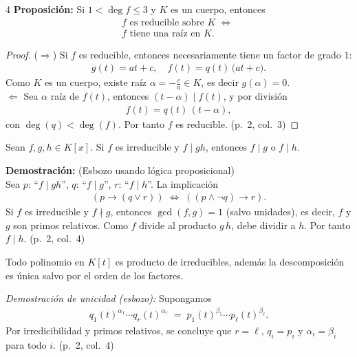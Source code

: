 \documentclass[landscape,a4paper]{article}
\begin{document}
\begin{multicols}{4}
\noindent \textbf{Proposición:} Si $1 < \deg f \le 3$ y $K$ es un cuerpo, entonces 
\begin{align*}
f \text{ es reducible sobre }K \;\Longleftrightarrow\; \\f \text{ tiene una raíz en }K.
\end{align*}
\begin{proof}
($\Rightarrow$) Si $f$ es reducible, entonces necesariamente tiene un factor de grado $1$: 
\begin{align*}
g(t) = a t + c, 
\quad
f(t) = q(t)\,\bigl(a t + c\bigr).
\end{align*}
Como $K$ es un cuerpo, existe raíz $\alpha = -\frac{c}{a} \in K$, es decir $g(\alpha)=0$.\\
$\Longleftarrow$ Sea $\alpha$ raíz de $f(t)$, entonces $(t - \alpha)\mid f(t)$, y por división 
\begin{align*}
f(t) = q(t)\,(t - \alpha),
\end{align*}
con $\deg(q)<\deg(f)$. Por tanto $f$ es reducible. (p.~2, col.~3)
\end{proof}
\begin{tcolorbox}[colback=white,colframe=red!80!black,colbacktitle=red!80!black,coltitle=white,title=Lema: {Primos Relativos (p.~2, col.~4)}]
Sean $f,g,h \in K[x]$. Si $f$ es irreducible y $f \mid gh$, entonces $f \mid g$ o $f \mid h$. 
\end{tcolorbox}
\noindent \textbf{Demostración:} (Esbozo usando lógica proposicional)\\
Sea $p$: “$f \mid gh$”, $q$: “$f \mid g$”, $r$: “$f \mid h$”. La implicación 
\begin{align*}
(p \rightarrow (q \lor r)) \;\Longleftrightarrow\; ((p \land \neg q) \rightarrow r).
\end{align*}
Si $f$ es irreducible y $f \nmid g$, entonces $\gcd(f,g)=1$ (salvo unidades), es decir, $f$ y $g$ son primos relativos. Como $f$ divide al producto $g\,h$, debe dividir a $h$. Por tanto $f \mid h$. (p.~2, col.~4)\\
\vspace{0.5em}
\begin{tcolorbox}[colback=white,colframe=red!80!black,colbacktitle=red!80!black,coltitle=white,title=Teorema: {Factorización única (p.~2, col.~4)}]
Todo polinomio en $K[t]$ es producto de irreducibles, además la descomposición es única salvo por el orden de los factores.
\end{tcolorbox}
\noindent \emph{Demostración de unicidad (esbozo):} Supongamos 
\begin{align*}
q_1(t)^{\alpha_1} \cdots q_r(t)^{\alpha_r} 
\;=\; 
p_1(t)^{\beta_1} \cdots p_\ell(t)^{\beta_\ell}.
\end{align*}
Por irredicibilidad y primos relativos, se concluye que $r=\ell$, $q_i = p_i$ y $\alpha_i = \beta_i$ para todo $i$. (p.~2, col.~4)


\end{multicols}
\end{document}
